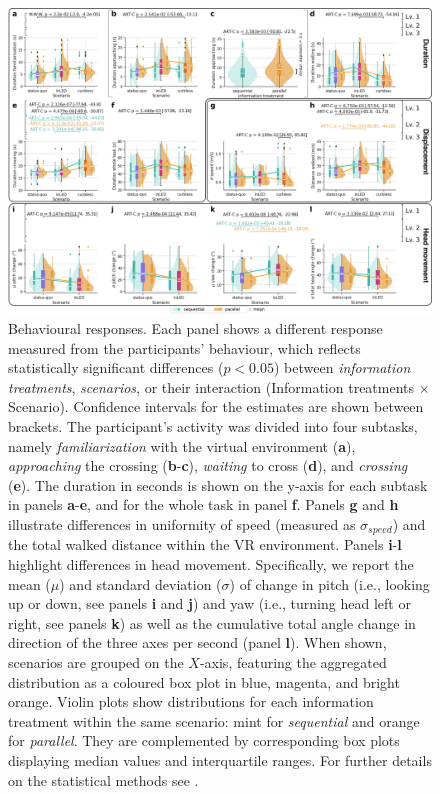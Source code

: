 \begin{figure}[hbtp!]
\centering
\includegraphics[width=\linewidth]{violin_plots_physio_MASTER_v7.jpg}
\caption{Behavioural responses. Each panel shows a different response measured from the participants' behaviour, which reflects statistically significant differences ($p<0.05$) between \emph{information treatments}, \emph{scenarios}, or their interaction (Information treatments $\times$ Scenario). Confidence intervals for the estimates are shown between brackets.
The participant's activity was divided into four subtasks, namely \emph{familiarization} with the virtual environment (\textbf{a}), \emph{approaching} the crossing (\textbf{b}-\textbf{c}), \emph{waiting} to cross (\textbf{d}), and \emph{crossing} (\textbf{e}). 
The duration in seconds is shown on the y-axis for each subtask in panels \textbf{a}-\textbf{e}, and for the whole task in panel \textbf{f}.
Panels \textbf{g} and \textbf{h} illustrate differences in uniformity of speed (measured as $\sigma_{speed}$) and the total walked distance within the VR environment.
Panels \textbf{i}-\textbf{l} highlight differences in head movement.
Specifically, we report the mean ($\mu$) and standard deviation ($\sigma$) of change in pitch (i.e., looking up or down, see panels \textbf{i} and \textbf{j}) and yaw (i.e., turning head left or right, see panels \textbf{k}) as well as the cumulative total angle change in direction of the three axes per second (panel \textbf{l}). 
When shown, scenarios are grouped on the $X$-axis, featuring the aggregated distribution as a coloured box plot in blue, magenta, and bright orange. Violin plots show distributions for each information treatment within the same scenario: mint for \emph{sequential} and orange for \emph{parallel}. They are complemented by corresponding box plots displaying median values and interquartile ranges. For further details on the statistical methods see .
}
\label{fig:violin_sign_phisiological}
\end{figure}

